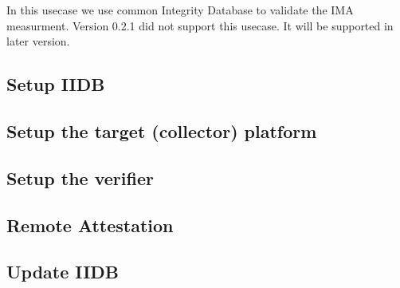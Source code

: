 In this usecase we use common Integrity Database to validate the IMA measurment.
Version 0.2.1 did not support this usecase. It will be supported in later version.

\subsection{Setup IIDB} 

\subsection{Setup the target (collector) platform} 

\subsection{Setup the verifier} 

\subsection{Remote Attestation} 

\subsection{Update IIDB} 

